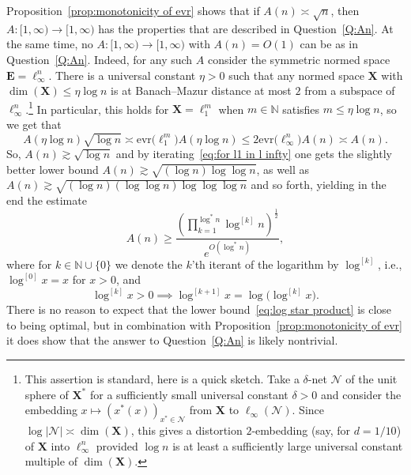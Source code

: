 \documentclass[11pt,reqno]{amsart}
\renewcommand{\le}{\leqslant}
\renewcommand{\ge}{\geqslant}
\renewcommand{\d}{\delta}
\newcommand{\evr}{\mathrm{evr}}
\newcommand{\NN}{\mathcal{N}}
\newcommand{\X}{\mathbf X}
\theoremstyle{remark}
\newcommand{\N}{\mathbb N}
\renewcommand{\1}{\mathbf 1}
\newcommand{\bfE}{\mathbf{E}}
\begin{document}
Proposition~\ref{prop:monotonicity of evr}  shows that if  $A(n)\asymp\sqrt{n}$, then $A:[1,\infty)\to [1,\infty)$ has the properties that are described in Question~\ref{Q:An}. At the same time,  no $A:[1,\infty)\to [1,\infty)$  with $A(n)=O(1)$ can be as in  Question~\ref{Q:An}. Indeed, for any such  $A$ consider the symmetric normed space $\bfE=\ell_\infty^n$. There is a universal constant $\eta>0$ such that any normed space $\X$ with $\dim(\X)\le \eta\log n$ is at Banach--Mazur distance at most $2$ from a subspace of $\ell_\infty^n$.\footnote{This assertion is  standard, here is a quick sketch. Take a $\d$-net $\NN$ of the unit sphere of $\X^*$   for a sufficiently small universal constant $\d>0$ and consider the embedding $x\mapsto (x^*(x))_{x^*\in \NN}$ from $\X$ to $\ell_\infty(\NN)$. Since $\log |\NN|\asymp \dim(\X)$, this gives a distortion $2$-embedding (say, for $d=1/10$) of $\X$ into $\ell_\infty^n$ provided $\log n$ is at least a sufficiently large universal constant multiple of $\dim(\X)$.} In particular, this holds for $\X=\ell_1^m$ when $m\in \N$ satisfies $m\le \eta \log n$, so we get that
\begin{equation}\label{eq:for l1 in l infty}
A(\eta\log n)\sqrt{\log n}\asymp \evr\big(\ell_1^m\big)A(\eta\log n)\le 2\evr\big(\ell_\infty^n\big)A(n)\asymp A(n).
\end{equation}
 So, $A(n)\gtrsim \sqrt{\log n}$ and by iterating~\eqref{eq:for l1 in l infty} one gets the slightly better lower bound $A(n)\gtrsim\sqrt{(\log n)\log\log n}$, as well as $A(n)\gtrsim\sqrt{(\log n)(\log\log n)\log\log \log n}$ and so forth, yielding in the end the estimate
\begin{equation}\label{eq:log star product}
 A(n)\ge \frac{\left(\prod_{k=1}^{\log^*\!\!n}\log^{[k]}\!\!n\right)^{\frac12}}{e^{O(\log^*\!\! n)}},
\end{equation}
where for  $k\in \N\cup\{0\}$ we denote the $k$'th iterant of the logarithm  by $\log^{[k]}$, i.e.,   $\log^{[0]}\!x=x$ for $x>0$, and
\begin{equation}\label{eq:iterated logarithm def}
\log^{[k]}\!\!x>0\implies  \log^{[k+1]}\!\!x=\log \big(\log^{[k]}\!\!x\big).
\end{equation}
There is no reason to expect that the lower bound~\eqref{eq:log star product} is close to being optimal, but in combination with Proposition~\ref{prop:monotonicity of evr}  it does show that the answer to Question~\ref{Q:An} is likely nontrivial.
\end{document}
